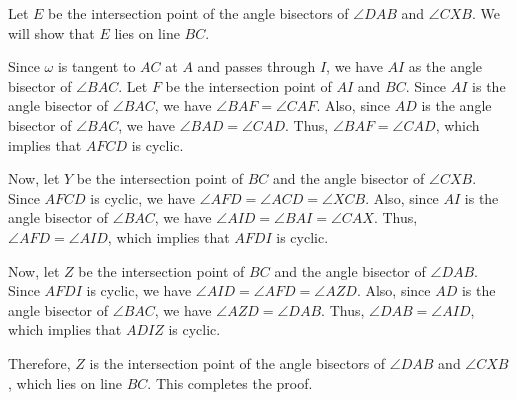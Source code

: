 Let $E$ be the intersection point of the angle bisectors of $\angle DAB$ and $\angle CXB$. We will show that $E$ lies on line $BC$.

Since $\omega$ is tangent to $AC$ at $A$ and passes through $I$, we have $AI$ as the angle bisector of $\angle BAC$. Let $F$ be the intersection point of $AI$ and $BC$. Since $AI$ is the angle bisector of $\angle BAC$, we have $\angle BAF = \angle CAF$. Also, since $AD$ is the angle bisector of $\angle BAC$, we have $\angle BAD = \angle CAD$. Thus, $\angle BAF = \angle CAD$, which implies that $AFCD$ is cyclic.

Now, let $Y$ be the intersection point of $BC$ and the angle bisector of $\angle CXB$. Since $AFCD$ is cyclic, we have $\angle AFD = \angle ACD = \angle XCB$. Also, since $AI$ is the angle bisector of $\angle BAC$, we have $\angle AID = \angle BAI = \angle CAX$. Thus, $\angle AFD = \angle AID$, which implies that $AFDI$ is cyclic.

Now, let $Z$ be the intersection point of $BC$ and the angle bisector of $\angle DAB$. Since $AFDI$ is cyclic, we have $\angle AID = \angle AFD = \angle AZD$. Also, since $AD$ is the angle bisector of $\angle BAC$, we have $\angle AZD = \angle DAB$. Thus, $\angle DAB = \angle AID$, which implies that $ADIZ$ is cyclic.

Therefore, $Z$ is the intersection point of the angle bisectors of $\angle DAB$ and $\angle CXB$, which lies on line $BC$. This completes the proof.
